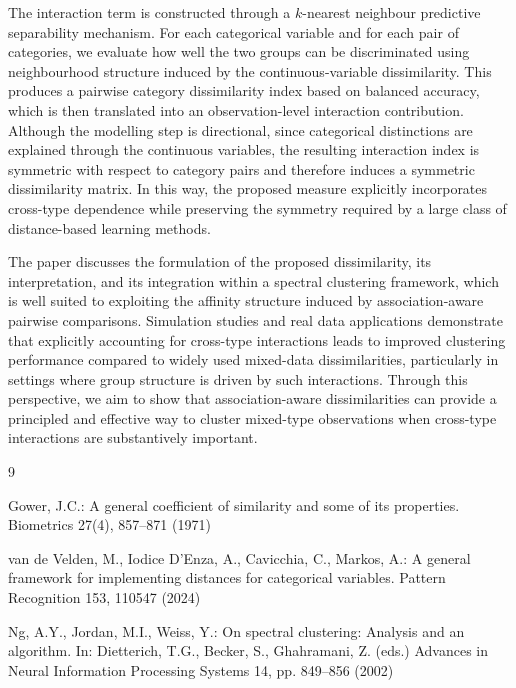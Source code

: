 \documentclass{svproc}
\begin{document}
The interaction term is constructed through a $k$-nearest neighbour predictive separability mechanism. For each categorical variable and for each pair of categories, we evaluate how well the two groups can be discriminated using neighbourhood structure induced by the continuous-variable dissimilarity. This produces a pairwise category dissimilarity index based on balanced accuracy, which is then translated into an observation-level interaction contribution. Although the modelling step is directional, since categorical distinctions are explained through the continuous variables, the resulting interaction index is symmetric with respect to category pairs and therefore induces a symmetric dissimilarity matrix. In this way, the proposed measure explicitly incorporates cross-type dependence while preserving the symmetry required by a large class of distance-based learning methods.


The paper discusses the formulation of the proposed dissimilarity, its interpretation, and its integration within a spectral clustering \cite{ng2002} framework, which is well suited to exploiting the affinity structure induced by association-aware pairwise comparisons. Simulation studies and real data applications demonstrate that explicitly accounting for cross-type interactions leads to improved clustering performance compared to widely used mixed-data dissimilarities, particularly in settings where group structure is driven by such interactions. Through this perspective, we aim to show that association-aware dissimilarities can provide a principled and effective way to cluster mixed-type observations when cross-type interactions are substantively important.
%
%
\begin{thebibliography}{9}

Gower, J.C.: A general coefficient of similarity and some of its properties.
Biometrics 27(4), 857--871 (1971)

van de Velden, M., Iodice D'Enza, A., Cavicchia, C., Markos, A.:
A general framework for implementing distances for categorical variables.
Pattern Recognition 153, 110547 (2024)

Ng, A.Y., Jordan, M.I., Weiss, Y.:
On spectral clustering: Analysis and an algorithm.
In: Dietterich, T.G., Becker, S., Ghahramani, Z. (eds.)
Advances in Neural Information Processing Systems 14, pp. 849--856 (2002)


\end{thebibliography}
\end{document}
